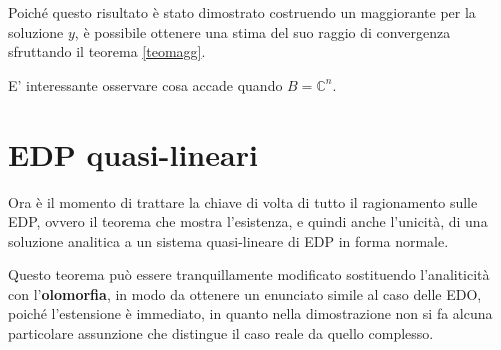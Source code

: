 Poiché questo risultato è stato dimostrato costruendo un maggiorante per la soluzione $y$, è possibile ottenere una stima del suo raggio di convergenza sfruttando il teorema \ref{teomagg}.

\begin{theorem}
\end{theorem}

\begin{remark}
E' interessante osservare cosa accade quando $B=\mathbb{C}^n$.
\end{remark}




\newpage
\section{EDP quasi-lineari}

Ora è il momento di trattare la chiave di volta di tutto il ragionamento sulle EDP, ovvero il teorema che mostra l'esistenza, e quindi anche l'unicità, di una soluzione analitica a un sistema quasi-lineare di EDP in forma normale.

\begin{theorem}\label{teoquasilin}
\end{theorem}

\begin{remark}
Questo teorema può essere tranquillamente modificato sostituendo l'analiticità con l'\textbf{olomorfia}, in modo da ottenere un enunciato simile al caso delle EDO, poiché l'estensione è immediato, in quanto nella dimostrazione non si fa alcuna particolare assunzione che distingue il caso reale da quello complesso.
\end{remark}



